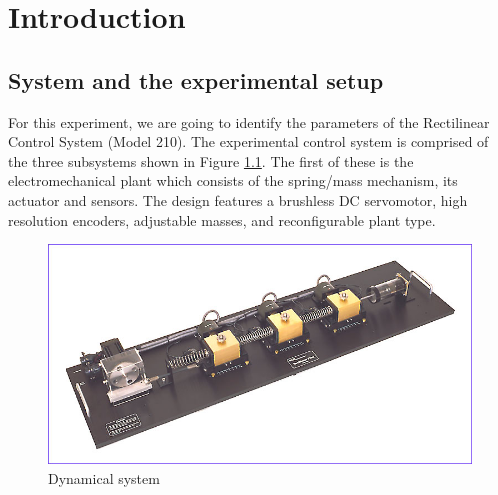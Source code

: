 \chapter{Introduction}
\label{chap:Introduction}

\section{System and the experimental setup}
\label{sec:intro1}

For this experiment, we are going to identify the parameters of the Rectilinear
Control System (Model 210).
The experimental control system is comprised of the three subsystems shown in
Figure \ref{fig:dynamicalsystem}. The first of these is the electromechanical
plant which consists of the spring/mass mechanism, its actuator and sensors.
The design features a brushless DC servomotor, high resolution encoders,
adjustable masses, and reconfigurable plant type.
%
\begin{figure}[ht]
\centering
\includegraphics[width=0.8\linewidth]{linlrge}
\caption{Dynamical system}
\label{fig:dynamicalsystem}
\end{figure}
